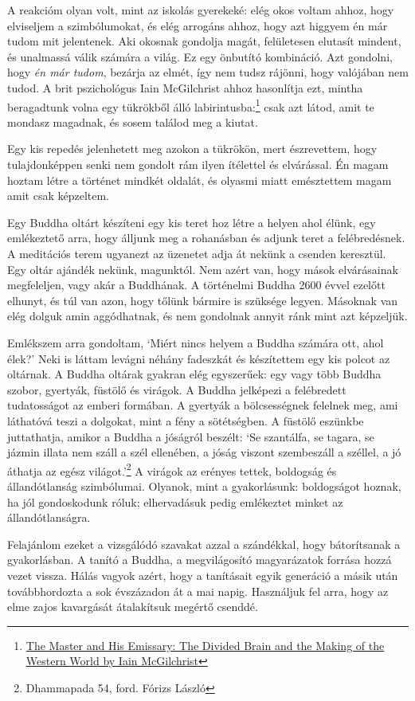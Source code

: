 A reakcióm olyan volt, mint az iskolás gyerekeké: elég okos voltam
ahhoz, hogy elviseljem a szimbólumokat, és elég arrogáns ahhoz, hogy azt
higgyem én már tudom mit jelentenek. Aki okosnak gondolja magát,
felületesen elutasít mindent, és unalmassá válik számára a világ. Ez egy
önbutító kombináció. Azt gondolni, hogy \emph{én már tudom}, bezárja az
elmét, így nem tudsz rájönni, hogy valójában nem tudod. A brit
pszichológus Iain McGilchrist ahhoz hasonlítja ezt, mintha beragadtunk
volna egy tükrökből álló labirintusba:\footnote{\href{https://www.goodreads.com/book/show/6968772-the-master-and-his-emissary}{The
  Master and His Emissary: The Divided Brain and the Making of the
  Western World by Iain McGilchrist}} csak azt látod, amit te mondasz
magadnak, és sosem találod meg a kiutat.

Egy kis repedés jelenhetett meg azokon a tükrökön, mert észrevettem,
hogy tulajdonképpen senki nem gondolt rám ilyen ítélettel és elvárással.
Én magam hoztam létre a történet mindkét oldalát, és olyasmi miatt
emésztettem magam amit csak képzeltem.

Egy Buddha oltárt készíteni egy kis teret hoz létre a helyen ahol élünk,
egy emlékeztető arra, hogy álljunk meg a rohanásban és adjunk teret a
felébredésnek. A meditációs terem ugyanezt az üzenetet adja át nekünk a
csenden keresztül. Egy oltár ajándék nekünk, magunktól. Nem azért van,
hogy mások elvárásainak megfeleljen, vagy akár a Buddhának. A történelmi
Buddha 2600 évvel ezelőtt elhunyt, és túl van azon, hogy tőlünk bármire
is szüksége legyen. Másoknak van elég dolguk amin aggódhatnak, és nem
gondolnak annyit ránk mint azt képzeljük.

\enlargethispage*{\baselineskip}

Emlékszem arra gondoltam, `Miért nincs helyem a Buddha számára ott, ahol
élek?' Neki is láttam levágni néhány fadeszkát és készítettem egy kis
polcot az oltárnak. A Buddha oltárak gyakran elég egyszerűek: egy vagy
több Buddha szobor, gyertyák, füstölő és virágok. A Buddha jelképezi a
felébredett tudatosságot az emberi formában. A gyertyák a bölcsességnek
felelnek meg, ami láthatóvá teszi a dolgokat, mint a fény a sötétségben.
A füstölő eszünkbe juttathatja, amikor a Buddha a jóságról beszélt: `Se
szantálfa, se tagara, se jázmin illata nem száll a szél ellenében, a
jóság viszont szembeszáll a széllel, a jó áthatja az egész
világot.'\footnote{Dhammapada 54, ford. Fórizs László} A virágok az
erényes tettek, boldogság és állandótlanság szimbólumai. Olyanok, mint a
gyakorlásunk: boldogságot hoznak, ha jól gondoskodunk róluk;
elhervadásuk pedig emlékeztet minket az állandótlanságra.

Felajánlom ezeket a vizsgálódó szavakat azzal a szándékkal, hogy
bátorítsanak a gyakorlásban. A tanító a Buddha, a megvilágosító
magyarázatok forrása hozzá vezet vissza. Hálás vagyok azért, hogy a
tanításait egyik generáció a másik után továbbhordozta a sok évszázadon
át a mai napig. Használjuk fel arra, hogy az elme zajos kavargását
átalakítsuk megértő csenddé.
